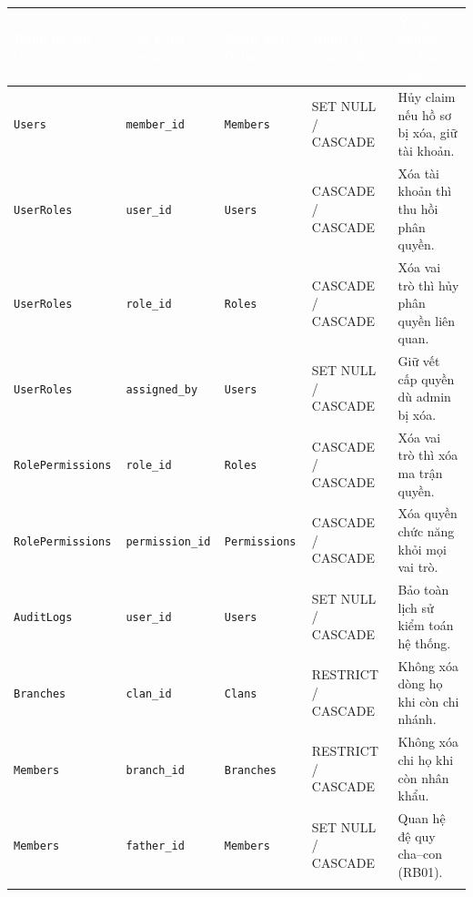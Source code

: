 \begin{table}[H]
    \centering
    \footnotesize
    \renewcommand{\arraystretch}{1.2}
    \begin{tabularx}{\textwidth}{|l|l|l|l|X|}
        \hline
        \rowcolor{tableheader}
        \textcolor{white}{\textbf{Bảng nguồn (Con)}} &
        \textcolor{white}{\textbf{Cột khóa ngoại}} &
        \textcolor{white}{\textbf{Bảng đích (Cha)}} &
        \textcolor{white}{\textbf{Hành vi xóa / sửa}} &
        \textcolor{white}{\textbf{Ý nghĩa nghiệp vụ bảo toàn}} \\
        \hline
        \rowcolor{tablerowalt}
        \texttt{Users} & \texttt{member\_id} & \texttt{Members} & SET NULL / CASCADE & Hủy claim nếu hồ sơ bị xóa, giữ tài khoản. \\
        \hline
        \texttt{UserRoles} & \texttt{user\_id} & \texttt{Users} & CASCADE / CASCADE & Xóa tài khoản thì thu hồi phân quyền. \\
        \rowcolor{tablerowalt}
        \texttt{UserRoles} & \texttt{role\_id} & \texttt{Roles} & CASCADE / CASCADE & Xóa vai trò thì hủy phân quyền liên quan. \\
        \hline
        \texttt{UserRoles} & \texttt{assigned\_by} & \texttt{Users} & SET NULL / CASCADE & Giữ vết cấp quyền dù admin bị xóa. \\
        \hline
        \rowcolor{tablerowalt}
        \texttt{RolePermissions} & \texttt{role\_id} & \texttt{Roles} & CASCADE / CASCADE & Xóa vai trò thì xóa ma trận quyền. \\
        \hline
        \texttt{RolePermissions} & \texttt{permission\_id} & \texttt{Permissions} & CASCADE / CASCADE & Xóa quyền chức năng khỏi mọi vai trò. \\
        \hline
        \rowcolor{tablerowalt}
        \texttt{AuditLogs} & \texttt{user\_id} & \texttt{Users} & SET NULL / CASCADE & Bảo toàn lịch sử kiểm toán hệ thống. \\
        \hline
        \texttt{Branches} & \texttt{clan\_id} & \texttt{Clans} & RESTRICT / CASCADE & Không xóa dòng họ khi còn chi nhánh. \\
        \hline
        \rowcolor{tablerowalt}
        \texttt{Members} & \texttt{branch\_id} & \texttt{Branches} & RESTRICT / CASCADE & Không xóa chi họ khi còn nhân khẩu. \\
        \hline
        \texttt{Members} & \texttt{father\_id} & \texttt{Members} & SET NULL / CASCADE & Quan hệ đệ quy cha--con (RB01). \\
        \hline
        \rowcolor{tablerowalt}

\end{tabularx}
\end{table}
